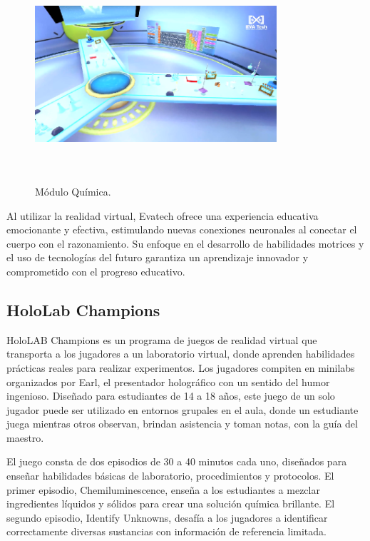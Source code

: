 \begin{figure}[thbp]
    \centering
    \includegraphics[width=0.8\textwidth, height=8cm]{img/chapter01/Eva_Tech.png}
    \caption{Módulo Química.}\label{fig:Esquema}
\end{figure}

Al utilizar la realidad virtual, Evatech ofrece una experiencia educativa emocionante y efectiva, estimulando nuevas conexiones neuronales al conectar el cuerpo con el razonamiento. Su enfoque en el desarrollo de habilidades motrices y el uso de tecnologías del futuro garantiza un aprendizaje innovador y comprometido con el progreso educativo.

\newpage
\subsection{HoloLab Champions}

HoloLAB Champions es un programa de juegos de realidad virtual que transporta a los jugadores a un laboratorio virtual, donde aprenden habilidades prácticas reales para realizar experimentos. Los jugadores compiten en minilabs organizados por Earl, el presentador holográfico con un sentido del humor ingenioso. Diseñado para estudiantes de 14 a 18 años, este juego de un solo jugador puede ser utilizado en entornos grupales en el aula, donde un estudiante juega mientras otros observan, brindan asistencia y toman notas, con la guía del maestro.

El juego consta de dos episodios de 30 a 40 minutos cada uno, diseñados para enseñar habilidades básicas de laboratorio, procedimientos y protocolos. El primer episodio, Chemiluminescence, enseña a los estudiantes a mezclar ingredientes líquidos y sólidos para crear una solución química brillante. El segundo episodio, Identify Unknowns, desafía a los jugadores a identificar correctamente diversas sustancias con información de referencia limitada.

